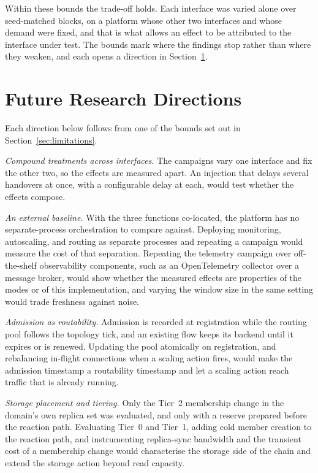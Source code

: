 ﻿\documentclass[12pt,reqno,twoside]{amsbook}
\begin{document}
Within these bounds the trade-off holds. Each interface was varied alone over
seed-matched blocks, on a platform whose other two interfaces and whose demand
were fixed, and that is what allows an effect to be attributed to the interface
under test. The bounds mark where the findings stop rather than where they
weaken, and each opens a direction in Section~\ref{sec:future_work}.

\section{Future Research Directions}\label{sec:future_work}
Each direction below follows from one of the bounds set out in
Section~\ref{sec:limitations}.

\emph{Compound treatments across interfaces.} The campaigns vary one interface
and fix the other two, so the effects are measured apart. An injection that
delays several handovers at once, with a configurable delay at each, would test
whether the effects compose.

\emph{An external baseline.} With the three functions co-located, the platform
has no separate-process orchestration to compare against. Deploying monitoring,
autoscaling, and routing as separate processes and repeating a campaign would
measure the cost of that separation. Repeating the telemetry campaign over
off-the-shelf observability components, such as an OpenTelemetry collector over
a message broker, would show whether the measured effects are properties of the
modes or of this implementation, and varying the window size in the same setting
would trade freshness against noise.

\emph{Admission as routability.} Admission is recorded at registration while the
routing pool follows the topology tick, and an existing flow keeps its backend
until it expires or is renewed. Updating the pool atomically on registration,
and rebalancing in-flight connections when a scaling action fires, would make
the admission timestamp a routability timestamp and let a scaling action reach
traffic that is already running.

\emph{Storage placement and tiering.} Only the Tier~2 membership change in the
domain's own replica set was evaluated, and only with a reserve prepared before
the reaction path. Evaluating Tier~0 and Tier~1, adding cold member creation to
the reaction path, and instrumenting replica-sync bandwidth and the transient
cost of a membership change would characterise the storage side of the chain and
extend the storage action beyond read capacity.
\end{document}
